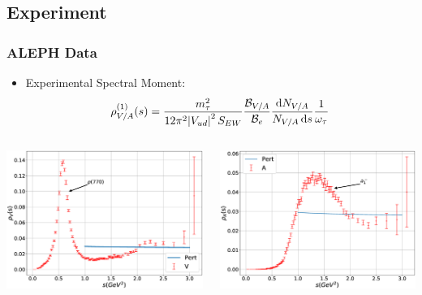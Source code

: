 \documentclass{beamer}
\begin{document}
\subsection{Experiment}
\begin{frame}
  \frametitle{ALEPH Data}
  \begin{itemize}
    \item Experimental Spectral Moment:
      \begin{equation}
        \rho^{(1)}_{V/A}(s) = \frac{m_\tau^2}{12 \pi^2 \abs{V_{ud}}^2 S_{EW}} \frac{\mathcal{B}_{V/A}}{\mathcal{B}_e} \frac{\dif N_{V/A}}{N_{V/A}\dif s}
        \frac{1}{\omega_\tau}
      \end{equation}
  \end{itemize}

  \vfill

  \begin{columns}
    \begin{column}{0.5\textwidth}
      \includegraphics[width=\textwidth]{./images/specFuncAleph_V.eps}
    \end{column}
    \begin{column}{0.5\textwidth}
      \includegraphics[width=\textwidth]{./images/specFuncAleph_A.eps}
    \end{column}
  \end{columns}
\end{frame}
\end{document}
